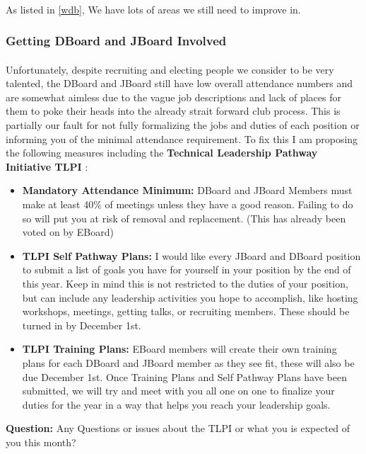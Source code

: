 \documentclass{article}
\begin{document}
\paragraph{}
As listed in \ref{wdb}, We have lots of areas we still need to improve in.
\subsubsection{Getting DBoard and JBoard Involved}
\paragraph{}
Unfortunately, despite recruiting and electing people we consider to be very talented, the DBoard and JBoard still have low overall attendance numbers and are somewhat aimless due to the vague job descriptions and lack of places for them to poke their heads into the already strait forward club process. This is partially our fault for not fully formalizing the jobs and duties of each position or informing you of the minimal attendance requirement. To fix this I am proposing the following measures including the \textbf{Technical Leadership Pathway Initiative TLPI} : 
\begin{itemize}
    \item \textbf{Mandatory Attendance Minimum:} DBoard and JBoard Members must make at least 40\% of meetings unless they have a good reason. Failing to do so will put you at risk of removal and replacement. (This has already been voted on by EBoard)  
    \item \textbf{TLPI Self Pathway Plans:} I would like every JBoard and DBoard position to submit a list of goals you have for yourself in your position by the end of this year. Keep in mind this is not restricted to the duties of your position, but can include any leadership activities you hope to accomplish, like hosting workshops, meetings, getting talks, or recruiting members. These should be turned in by December 1st.   
    \item \textbf{TLPI Training Plans:} EBoard members will create their own training plans for each DBoard and JBoard member as they see fit, these will also be due December 1st. Once Training Plans and Self Pathway Plans have been submitted, we will try and meet with you all one on one to finalize your duties for the year in a way that helps you reach your leadership goals.
\end{itemize}
\noindent
\textbf{Question:} Any Questions or issues about the TLPI or what you is expected of you this month?
\end{document}
